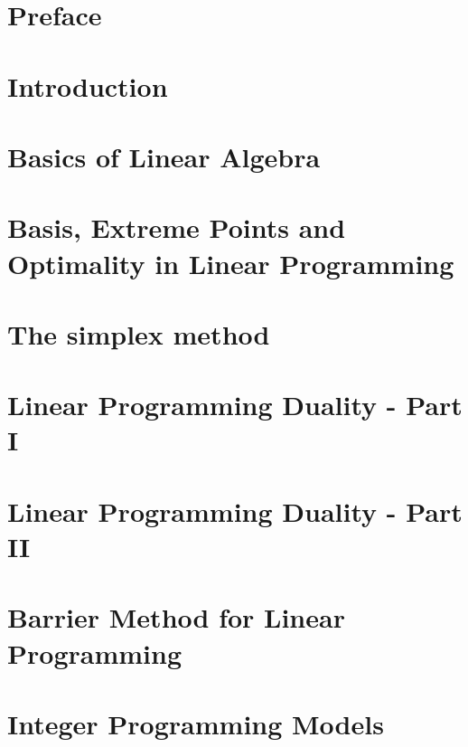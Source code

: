 \documentclass{bookest}
\begin{document}
	

	\chapter*{Preface}
	
	
	\tableofcontents

	\chapter{Introduction} \label{chapter_1}
	
	
	\chapter{Basics of Linear Algebra} \label{chapter_2}
	
	
	\chapter{Basis, Extreme Points and Optimality in Linear Programming} \label{chapter_3}
		 
	
	\chapter{The simplex method} \label{chapter_4}
		
		
	\chapter{Linear Programming Duality - Part I} \label{chapter_5}
		
	
	\chapter{Linear Programming Duality - Part II} \label{chapter_6}
	
	
	\chapter{Barrier Method for Linear Programming} \label{chapter_7}
	
	
	\chapter{Integer Programming Models} \label{chapter_8}
	
	
\end{document}
